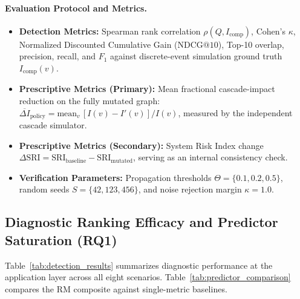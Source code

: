 \paragraph{Evaluation Protocol and Metrics.}
\begin{itemize}
    \item \textbf{Detection Metrics:} Spearman rank correlation $\rho(Q, I_{\text{comp}})$, Cohen's $\kappa$, Normalized Discounted Cumulative Gain ($\mathrm{NDCG@10}$), Top-10 overlap, precision, recall, and $F_1$ against discrete-event simulation ground truth $I_{\text{comp}}(v)$.
    \item \textbf{Prescriptive Metrics (Primary):} Mean fractional cascade-impact reduction on the fully mutated graph: $\overline{\Delta I}_{\text{policy}} = \mathrm{mean}_v\,[I(v) - I'(v)]/I(v)$, measured by the independent cascade simulator.
    \item \textbf{Prescriptive Metrics (Secondary):} System Risk Index change $\Delta\mathrm{SRI} = \mathrm{SRI}_{\text{baseline}} - \mathrm{SRI}_{\text{mutated}}$, serving as an internal consistency check.
    \item \textbf{Verification Parameters:} Propagation thresholds $\Theta = \{0.1, 0.2, 0.5\}$, random seeds $S = \{42, 123, 456\}$, and noise rejection margin $\kappa = 1.0$.
\end{itemize}

\subsection{Diagnostic Ranking Efficacy and Predictor Saturation (RQ1)}
\label{sec:results:detection}

Table~\ref{tab:detection_results} summarizes diagnostic performance at the application layer across all eight scenarios. Table~\ref{tab:predictor_comparison} compares the RM composite against single-metric baselines.

